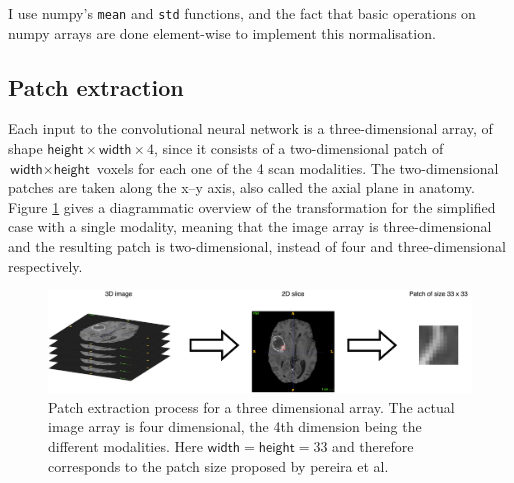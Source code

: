 \documentclass[12pt,a4paper,twoside,openright]{report}
\begin{document}
I use numpy's \texttt{mean} and \texttt{std} functions, and the fact that basic operations on numpy arrays are done element-wise to implement this normalisation.

\subsection{Patch extraction}
\label{section:patch_extraction}
Each input to the convolutional neural network is a three-dimensional array, of shape $\textsf{height} \times \textsf{width} \times 4$, since it consists of a two-dimensional patch of $\textsf{width} \times \textsf{height}$ voxels for each one of the 4 scan modalities. The two-dimensional patches are taken along the x--y axis, also called the axial plane in anatomy. Figure \ref{fig:patch_extraction} gives a diagrammatic overview of the transformation for the simplified case with a single modality, meaning that the image array is three-dimensional and the resulting patch is two-dimensional, instead of four and three-dimensional respectively.
\begin{figure}
	\centering
	\includegraphics[width=\textwidth]{patch_extraction}
	\caption[Patch extraction process for a three dimensional array.]{Patch extraction process for a three dimensional array. The actual image array is four dimensional, the 4th dimension being the different modalities. Here $\textsf{width}=\textsf{height}=33$ and therefore corresponds to the patch size proposed by pereira et al.}
	\label{fig:patch_extraction}
\end{figure}
\end{document}
